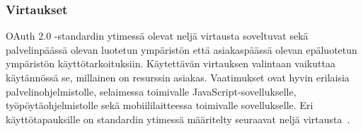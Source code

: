 \documentclass[finnish,gradu]{tktltiki}
\begin{document}


  \subsubsection{Virtaukset} %
  \label{ssub:oauth_virtaukset}

  OAuth 2.0 -standardin ytimessä olevat neljä virtausta soveltuvat sekä palvelinpäässä olevan luotetun ympäristön että asiakaspäässä olevan epäluotetun ympäristön käyttötarkoituksiin. Käytettävän virtauksen valintaan vaikuttaa käytännössä se, millainen on resurssin asiakas. Vaatimukset ovat hyvin erilaisia palvelinohjelmistolle, selaimessa toimivalle JavaScript-sovellukselle, työpöytäohjelmistolle sekä mobiililaitteessa toimivalle sovellukselle. Eri käyttötapauksille on standardin ytimessä määritelty seuraavat neljä virtausta~\cite{ietf_oauth2}.
\end{document}
